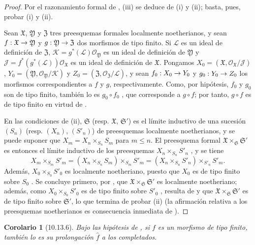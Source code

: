 \documentclass[oneside]{amsart}
\theoremstyle{ega-env-style}
\theoremstyle{ega-thm-env-style}
\newtheorem*{corollary}{Corolario}
\theoremstyle{ega-defn-env-style}
\def\leq{\leqslant}                 %
\renewcommand{\to}{\mathchoice{\longrightarrow}{\rightarrow}{\rightarrow}{\rightarrow}}
\let\EGAOriginalLabel\label
\renewcommand{\label}[1]{\phantomsection\EGAOriginalLabel{#1}}
\begin{document}
\begin{proof}
Por el razonamiento formal de , (iii) se deduce de (i) y (ii); basta, pues, probar (i) y (ii).

Sean $\mathfrak{X}$, $\mathfrak{Y}$ y $\mathfrak{Z}$ tres preesquemas formales localmente noetherianos, y sean $f:\mathfrak{X}\to\mathfrak{Y}$ y $g:\mathfrak{Y}\to\mathfrak{Z}$ dos morfismos de tipo finito.
Si $\mathscr{L}$ es un ideal de definición de $\mathfrak{Z}$, $\mathscr{K}=g^*(\mathscr{L})\mathscr{O}_{\mathfrak{Y}}$ es un ideal de definición de $\mathfrak{Y}$ y $\mathscr{J}=f^*(g^*(\mathscr{L}))\mathscr{O}_{\mathfrak{X}}$ es un ideal de definición de $\mathfrak{X}$.
Pongamos $X_0=(\mathfrak{X},\mathscr{O}_{\mathfrak{X}}/\mathscr{J})$, $Y_0=(\mathfrak{Y},\mathscr{O}_{\mathfrak{Y}}/\mathscr{K})$ y $Z_0=(\mathfrak{Z},\mathscr{O}_{\mathfrak{Z}}/\mathscr{L})$, y sean $f_0:X_0\to Y_0$ y $g_0:Y_0\to Z_0$ los morfismos correspondientes a $f$ y $g$, respectivamente.
Como, por hipótesis, $f_0$ y $g_0$ son de tipo finito, también lo es $g_0\circ f_0$ , que corresponde a $g\circ f$;
por tanto, $g\circ f$ es de tipo finito en virtud de .

En las condiciones de (ii), $\mathfrak{S}$ (resp. $\mathfrak{X}$, $\mathfrak{S}'$) es el límite inductivo de una sucesión $(S_n)$ (resp. $(X_n)$, $(S'_n)$) de preesquemas localmente noetherianos, y se puede suponer  que $X_m=X_n\times_{S_n}S_m$ para $m\leq n$.
El preesquema formal $\mathfrak{X}\times_{\mathfrak{S}}\mathfrak{S}'$ es entonces el límite inductivo de los preesquemas $X_n\times_{S_n}S'_n$ , y se tiene
\[
  X_m\times_{S_m}S'_m
  =(X_n\times_{S_n}S_m)\times_{S_m}S'_m
  =(X_n\times_{S_n}S'_n)\times_{S'_n}S'_m.
\]
Además, $X_0\times_{S_0}S'_0$ es localmente noetheriano, puesto que $X_0$ es de tipo finito sobre $S_0$ .
Se concluye primero, por , que $\mathfrak{X}\times_{\mathfrak{S}}\mathfrak{S}'$ es localmente noetheriano;
además, como $X_0\times_{S_0}S'_0$ es de tipo finito sobre $S'_0$ , resulta de  y  que $\mathfrak{X}\times_{\mathfrak{S}}\mathfrak{S}'$ es de tipo finito sobre $\mathfrak{S}'$, lo que termina de probar (ii) (la afirmación relativa a los preesquemas noetherianos es consecuencia inmediata de ).
\end{proof}

\begin{corollary}[10.13.6]
\label{I.10.13.6}
Bajo las hipótesis de , si $f$ es un morfismo de tipo finito, también lo es su prolongación $\widehat f$ a los completados.
\end{corollary}
\end{document}
